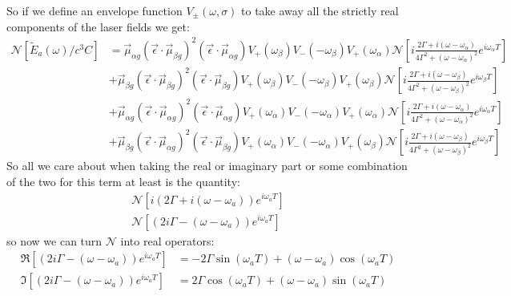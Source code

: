 So if we define an envelope function $V_{\pm}(\omega, \sigma)$ to take away all the strictly real components of the laser fields we get:
\begin{align*}
	\mathcal{N} \left[\tilde{E}_a (\omega) / c^3 C\right] &= \vec{\mu}_{\alpha g} \left( \vec{\epsilon} \cdot \vec{\mu}_{\beta g} \right)^2 \left( \vec{\epsilon} \cdot \vec{\mu}_{\alpha g} \right) V_{+}(\omega_{\beta})V_{-}(-\omega_{\beta})V_{+}(\omega_{\alpha})\mathcal{N}  \left[ i   \frac{2 \Gamma + i \left( \omega - \omega_{\alpha}\right)}{4 \Gamma^2 +  \left( \omega - \omega_{\alpha}\right)^2} e^{i \omega_{\alpha} T}   \right] \\
	&+  \vec{\mu}_{\beta g} \left( \vec{\epsilon} \cdot \vec{\mu}_{\beta g} \right)^2 \left( \vec{\epsilon} \cdot \vec{\mu}_{\beta g} \right)V_{+}(\omega_{\beta})V_{-}(-\omega_{\beta})V_{+}(\omega_{\beta})  \mathcal{N} \left[i      \frac{2 \Gamma + i \left( \omega - \omega_{\beta}\right)}{4 \Gamma^2 +  \left( \omega - \omega_{\beta}\right)^2} e^{i \omega_{\beta} T }   \right] \\
	&+  \vec{\mu}_{\alpha g} \left( \vec{\epsilon} \cdot \vec{\mu}_{\alpha g} \right)^2 \left( \vec{\epsilon} \cdot \vec{\mu}_{\alpha g} \right) V_{+}(\omega_{\alpha})V_{-}(-\omega_{\alpha})V_{+}(\omega_{\alpha}) \mathcal{N} \left[  i   \frac{2 \Gamma + i \left( \omega - \omega_{\alpha}\right)}{4 \Gamma^2 +  \left( \omega - \omega_{\alpha}\right)^2} e^{i \omega_{\alpha} T}  \right] \\
	&+  \vec{\mu}_{\beta g} \left( \vec{\epsilon} \cdot \vec{\mu}_{\alpha g} \right)^2 \left( \vec{\epsilon} \cdot \vec{\mu}_{\beta g} \right) V_{+}(\omega_{\alpha})V_{-}(-\omega_{\alpha})V_{+}(\omega_{\beta}) \mathcal{N} \left[ i \frac{2 \Gamma + i \left( \omega - \omega_{\beta}\right)}{4 \Gamma^2 +  \left( \omega - \omega_{\beta}\right)^2} e^{i \omega_{\beta} T}   \right]
\end{align*}
So all we care about when taking the real or imaginary part or some combination of the two for this term at least is the quantity:
\begin{align}
	\mathcal{N} \left[ i \left( 2 \Gamma + i \left( \omega - \omega_{a}\right) \right) e^{i \omega_{a} T} \right] \\
	\mathcal{N} \left[ \left( 2 i \Gamma - \left( \omega - \omega_{a}\right) \right) e^{i \omega_{a} T} \right]
\end{align}
so now we can turn $\mathcal{N}$ into real operators:
\begin{align}
	\Re \left[ \left( 2 i \Gamma - \left( \omega - \omega_{a}\right) \right) e^{i \omega_{a} T} \right] &= -2 \Gamma \sin \left( \omega_{a} T \right) + \left( \omega - \omega_{a} \right) \cos \left( \omega_{a} T \right) \\
	\Im \left[ \left( 2 i \Gamma - \left( \omega - \omega_{a}\right) \right) e^{i \omega_{a} T} \right] &= 2 \Gamma \cos \left( \omega_{a} T \right) + \left( \omega - \omega_{a} \right) \sin  \left( \omega_{a} T \right)
\end{align}
